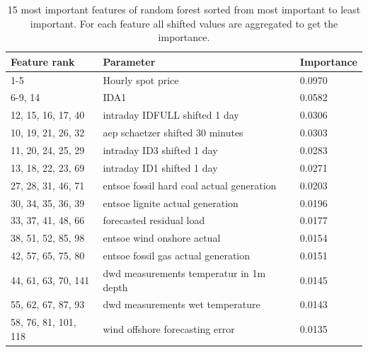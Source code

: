 \documentclass[class=scrbook, crop=false]{standalone}
\begin{document}
\begin{table}[]
\centering
\begin{tabular}{l|l|l}
 Feature rank & Parameter & Importance \\\hline
 1-5 & Hourly spot price& 0.0970\\
 6-9, 14& IDA1&0.0582 \\
 12, 15, 16, 17, 40&intraday IDFULL shifted 1 day & 0.0306 \\
 10, 19, 21, 26, 32  &aep schaetzer shifted 30 minutes&0.0303\\
 11, 20, 24, 25, 29 &intraday ID3 shifted 1 day &0.0283\\
 13, 18, 22, 23, 69 & intraday ID1 shifted 1 day &0.0271\\
 27, 28, 31, 46, 71 & entsoe fossil hard coal actual generation & 0.0203\\
 30, 34, 35, 36, 39 & entsoe lignite actual generation & 0.0196 \\
 33, 37, 41, 48, 66 & forecasted residual load & 0.0177 \\
 38, 51, 52, 85, 98 & entsoe wind onshore actual & 0.0154 \\
42, 57, 65, 75, 80 & entsoe fossil gas actual generation & 0.0151 \\
44, 61, 63, 70, 141 & dwd measurements temperatur in 1m depth & 0.0145 \\
55, 62, 67, 87, 93 & dwd measurements wet temperature & 0.0143 \\
58, 76, 81, 101, 118 & wind offshore forecasting error & 0.0135 \\
 
\end{tabular}
\caption{15 most important features of random forest sorted from most important to least important. For each feature all shifted values are aggregated to get the importance.}
\label{Table::Feature_importance}
\end{table}
\end{document}

